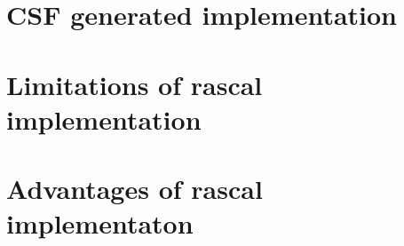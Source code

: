 \documentclass[a4paper, oneside, notitlepage]{article}
\begin{document}
\section{CSF generated implementation}

\section{Limitations of rascal implementation}

\section{Advantages of rascal implementaton}
\end{document}
